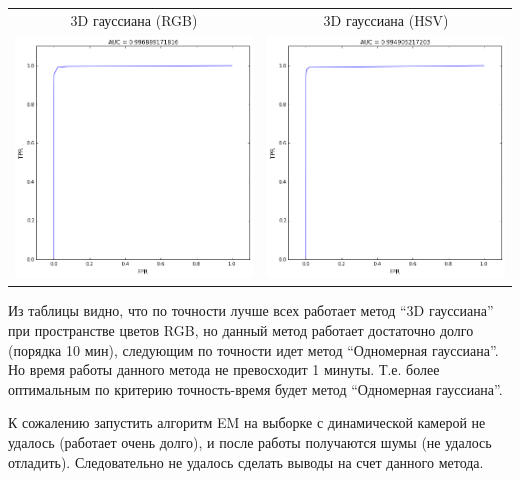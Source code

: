 \documentclass[12pt, a4paper]{article}
\begin{document}
\begin{center}
\begin{tabular}{c c}
				\hline
				3D гауссиана (RGB) & 3D гауссиана (HSV) \\
				\includegraphics[width=8cm]{3_par_rgb_auc.png} &
				\includegraphics[width=8cm]{3_par_hsv_auc.png} \\

				\hline
			\end{tabular}
		\end{center}

		Из таблицы видно, что по точности лучше всех работает метод ``3D гауссиана'' при пространстве цветов RGB, но данный метод работает достаточно долго (порядка 10 мин), следующим по точности идет метод ``Одномерная гауссиана''. Но время работы данного метода не превосходит 1 минуты. Т.е. более оптимальным по критерию точность-время будет метод ``Одномерная гауссиана''.

		К сожалению запустить алгоритм EM на выборке с динамической камерой не удалось (работает очень долго), и после работы получаются шумы (не удалось отладить). Следовательно не удалось сделать выводы на счет данного метода.
\end{document}
